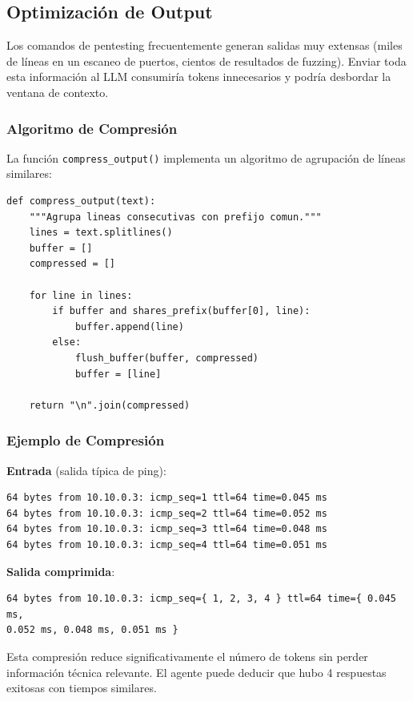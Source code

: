 \subsection{Optimización de Output}

Los comandos de pentesting frecuentemente generan salidas muy extensas (miles de líneas en un escaneo de puertos, cientos de resultados de fuzzing). Enviar toda esta información al LLM consumiría tokens innecesarios y podría desbordar la ventana de contexto.

\subsubsection{Algoritmo de Compresión}

La función \texttt{compress\_output()} implementa un algoritmo de agrupación de líneas similares:

\begin{verbatim}
def compress_output(text):
    """Agrupa lineas consecutivas con prefijo comun."""
    lines = text.splitlines()
    buffer = []
    compressed = []
    
    for line in lines:
        if buffer and shares_prefix(buffer[0], line):
            buffer.append(line)
        else:
            flush_buffer(buffer, compressed)
            buffer = [line]
    
    return "\n".join(compressed)
\end{verbatim}

\subsubsection{Ejemplo de Compresión}

\textbf{Entrada} (salida típica de ping):
\begin{verbatim}
64 bytes from 10.10.0.3: icmp_seq=1 ttl=64 time=0.045 ms
64 bytes from 10.10.0.3: icmp_seq=2 ttl=64 time=0.052 ms
64 bytes from 10.10.0.3: icmp_seq=3 ttl=64 time=0.048 ms
64 bytes from 10.10.0.3: icmp_seq=4 ttl=64 time=0.051 ms
\end{verbatim}

\textbf{Salida comprimida}:
\begin{verbatim}
64 bytes from 10.10.0.3: icmp_seq={ 1, 2, 3, 4 } ttl=64 time={ 0.045 ms, 
0.052 ms, 0.048 ms, 0.051 ms }
\end{verbatim}

Esta compresión reduce significativamente el número de tokens sin perder información técnica relevante. El agente puede deducir que hubo 4 respuestas exitosas con tiempos similares.

